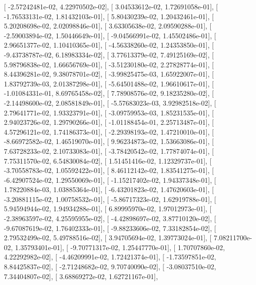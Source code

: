 \documentclass{article}
\begin{document}
       [ -2.57242481e-02,   4.22970502e-02],
       [  3.04533612e-02,   1.72691058e-01],
       [ -1.76533131e-02,   1.81432103e-01],
       [  5.80430239e-02,   1.20432461e-01],
       [  5.20208698e-02,   2.02098846e-01],
       [  3.63305638e-02,   2.09590288e-01],
       [ -2.59003894e-02,   1.50446649e-01],
       [ -9.04566991e-02,   1.45502486e-01],
       [  2.96651377e-02,   1.10410365e-01],
       [ -4.56338260e-02,   1.24353850e-01],
       [ -9.43738787e-02,   6.18983334e-02],
       [  3.77613379e-02,   7.49125169e-02],
       [  5.98796838e-02,   1.66656769e-01],
       [ -3.51230180e-02,   2.27828774e-01],
       [  8.44396281e-02,   9.38078701e-02],
       [ -3.99825475e-03,   1.65922007e-01],
       [  1.83792739e-03,   2.01387298e-01],
       [ -5.64501488e-02,   1.96610617e-01],
       [ -1.01084331e-01,   8.69765458e-02],
       [  7.78908576e-02,   9.18235280e-02],
       [ -2.14498600e-02,   2.08581849e-01],
       [ -5.57683023e-03,   3.92982518e-02],
       [  2.79641771e-02,   1.93323791e-01],
       [ -3.09759953e-03,   1.85231535e-01],
       [  2.94023726e-02,   1.29790266e-01],
       [ -1.01188454e-01,   2.25713487e-01],
       [  4.57296121e-02,   1.74186373e-01],
       [ -2.29398193e-02,   1.47210010e-01],
       [ -8.66972582e-02,   1.46519070e-01],
       [  9.96234873e-02,   1.53663086e-01],
       [  7.63728233e-02,   2.10733083e-01],
       [ -3.78420542e-02,   1.77874074e-01],
       [  7.75311570e-02,   6.54830084e-02],
       [  1.51451416e-02,   1.12329737e-01],
       [ -3.70558783e-02,   1.05592422e-01],
       [  8.46112142e-02,   1.83541275e-01],
       [ -6.42907524e-02,   1.29550069e-01],
       [ -1.15217402e-02,   1.94337348e-01],
       [  1.78220884e-03,   1.03885364e-01],
       [ -6.43201823e-02,   1.47620603e-01],
       [ -3.20881115e-02,   1.00758532e-01],
       [ -5.86717323e-02,   1.62919788e-01],
       [  5.94594944e-02,   1.94934288e-01],
       [  6.89995970e-02,   1.97012973e-01],
       [ -2.38963597e-02,   4.25595955e-02],
       [ -4.42898697e-02,   3.87710120e-02],
       [ -9.67087619e-02,   1.76402333e-01],
       [ -9.88233606e-02,   7.33182854e-02],
       [  2.79532499e-02,   5.49788516e-02],
       [  3.94705694e-02,   1.39773024e-01],
       [  7.08211700e-02,   1.35793401e-01],
       [ -9.70771317e-02,   1.25447770e-01],
       [  1.70707860e-02,   4.22292982e-02],
       [ -4.46209991e-02,   1.72421374e-01],
       [ -1.73597851e-02,   8.84425837e-02],
       [ -2.71248682e-02,   9.70740090e-02],
       [ -3.08037510e-02,   7.34404807e-02],
       [  3.68869272e-02,   1.62721167e-01],
\end{document}
